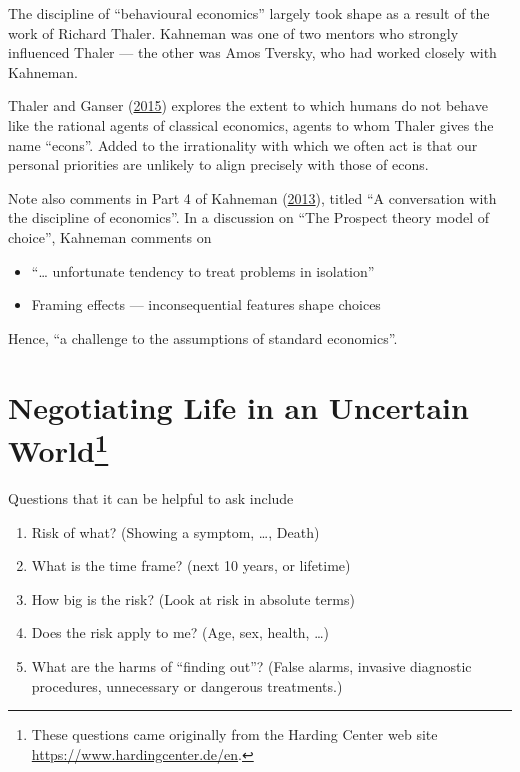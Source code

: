 \documentclass[
  10pt,
  b5paper]{book}
\providecommand{\tightlist}{%
  \setlength{\itemsep}{0pt}\setlength{\parskip}{0pt}}
\begin{document}
The discipline of ``behavioural economics'' largely took shape
as a result of the work of Richard Thaler. Kahneman was
one of two mentors who strongly influenced Thaler --- the
other was Amos Tversky, who had worked closely with Kahneman.

Thaler and Ganser (\protect\hyperlink{ref-thaler2015misbehaving}{2015}) explores the extent to which humans do
not behave like the rational agents of classical economics,
agents to whom Thaler gives the name ``econs''. Added to the
irrationality with which we often act is that our personal
priorities are unlikely to align precisely with those of econs.

Note also comments in Part 4 of Kahneman (\protect\hyperlink{ref-kahneman_2013}{2013}), titled
``A conversation with the discipline of economics''.
In a discussion on ``The Prospect theory model of choice'',
Kahneman comments on

\begin{itemize}
\tightlist
\item
  ``\ldots{} unfortunate tendency to treat problems in isolation''
\item
  Framing effects --- inconsequential features shape choices
\end{itemize}

Hence, ``a challenge to the assumptions of standard economics''.

\hypertarget{negotiating-life-in-an-uncertain-world}{%
\section[Negotiating Life in an Uncertain World]{\texorpdfstring{Negotiating Life in an Uncertain World\footnote{These questions came originally from the Harding Center web site \url{https://www.hardingcenter.de/en}.}}{Negotiating Life in an Uncertain World}}\label{negotiating-life-in-an-uncertain-world}}

Questions that it can be helpful to ask include

\begin{enumerate}
\def\labelenumi{\arabic{enumi}.}
\tightlist
\item
  Risk of what? (Showing a symptom, \ldots, Death)
\item
  What is the time frame? (next 10 years, or lifetime)
\item
  How big is the risk? (Look at risk in absolute terms)
\item
  Does the risk apply to me? (Age, sex, health, \ldots)
\item
  What are the harms of ``finding out''? (False alarms, invasive
  diagnostic procedures, unnecessary or dangerous treatments.)
\end{enumerate}
\end{document}
